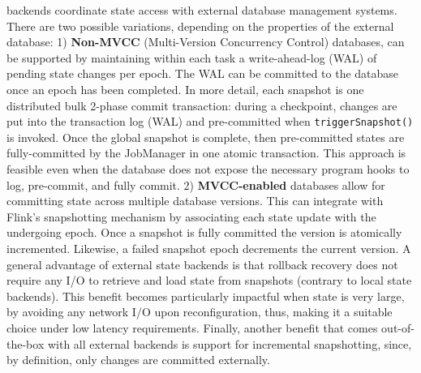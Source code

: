  backends coordinate state access with external database management systems. There are two possible variations, depending on the properties of the external database: 1) \textbf{Non-MVCC} (Multi-Version Concurrency Control) databases, can be supported by maintaining within each task a write-ahead-log (WAL) of pending state changes per epoch. The WAL can be committed to the database once an epoch has been completed. In more detail, each snapshot is one distributed bulk 2-phase commit transaction: during a checkpoint, changes are put into the transaction log (WAL) and pre-committed when \texttt{triggerSnapshot()} is invoked. Once the global snapshot is complete, then pre-committed states are fully-committed by the JobManager in one atomic transaction. This approach is feasible even when the database does not expose the necessary program hooks to log, pre-commit, and fully commit.
 2) \textbf{MVCC-enabled} databases allow for committing state across multiple database versions. This can integrate with Flink's snapshotting mechanism by associating each state update with the undergoing epoch. Once a snapshot is fully committed the version is atomically incremented. Likewise, a failed snapshot epoch decrements the current version. A general advantage of external state backends is that rollback recovery does not require any I/O to retrieve and load state from snapshots (contrary to local state backends). This benefit becomes particularly impactful when state is very large, by avoiding any network I/O upon reconfiguration, thus, making it a suitable choice under low latency requirements. Finally, another benefit that comes out-of-the-box with all external backends is support for incremental snapshotting, since, by definition, only changes are committed externally.
 


